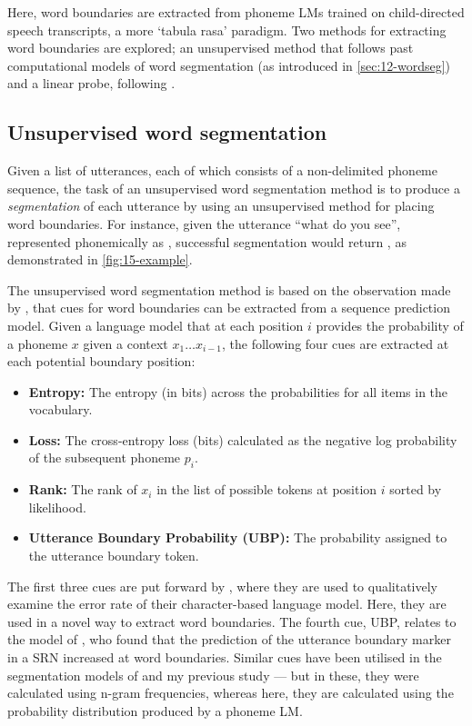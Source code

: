Here, word boundaries are extracted from phoneme LMs trained on child-directed speech transcripts, a more `tabula rasa' paradigm. Two methods for extracting word boundaries are explored; an unsupervised method that follows past computational models of word segmentation (as introduced in \cref{sec:12-wordseg}) and a linear probe, following \citet{hahn-baroni-2019-tabula}.

\subsection{Unsupervised word segmentation}\label{sec:15-wordsegunsupervised}

Given a list of utterances, each of which consists of a non-delimited phoneme sequence, the task of an unsupervised word segmentation method is to produce a \emph{segmentation} of each utterance by using an unsupervised method for placing word boundaries. For instance, given the utterance ``what do you see'', represented phonemically as , successful segmentation would return , as demonstrated in \cref{fig:15-example}.

The unsupervised word segmentation method is based on the observation made by \citet{elman-1990-finding}, that cues for word boundaries can be extracted from a sequence prediction model. Given a language model that at each position $i$ provides the probability of a phoneme $x$ given a context $x_1\ldots x_{i-1}$, the following four cues are extracted at each potential boundary position:

\begin{itemize}[leftmargin=*]
    \item \textbf{Entropy:} The entropy (in bits) across the probabilities for all items in the vocabulary.%
    \item \textbf{Loss:} The cross-entropy loss (bits) calculated as the negative log probability of the subsequent phoneme $p_i$.
    \item \textbf{Rank:} The rank of $x_i$ in the list of possible tokens at position $i$ sorted by likelihood.
    \item \textbf{Utterance Boundary Probability (UBP):} The probability assigned to the utterance boundary token.
\end{itemize}

The first three cues are put forward by \citet{al-rfou_character-level_2019}, where they are used to qualitatively examine the error rate of their character-based language model. Here, they are used in a novel way to extract word boundaries. The fourth cue, UBP, relates to the model of \citet{christiansen1998learning}, who found that the prediction of the utterance boundary marker in a SRN increased at word boundaries. Similar cues have been utilised in the segmentation models of \citet{ccoltekin2014explicit} and my previous study \citep{goriely2023word} --- but in these, they were calculated using n-gram frequencies, whereas here, they are calculated using the probability distribution produced by a phoneme LM.

